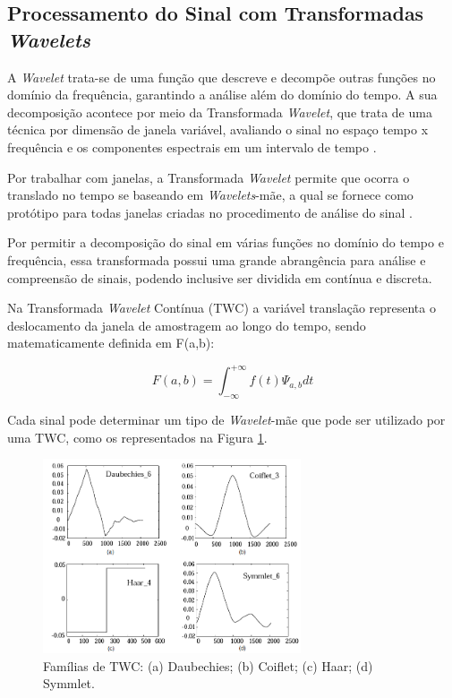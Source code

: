 \documentclass[conference]{IEEEtran}
\begin{document}
\subsection{Processamento do Sinal com Transformadas \textit{Wavelets}}
A \textit{Wavelet} trata-se de uma função que descreve e decompõe outras funções no domínio da frequência, garantindo a análise além do domínio do tempo. A sua decomposição acontece por meio da Transformada \textit{Wavelet}, que trata de uma técnica por dimensão de janela variável, avaliando o sinal no espaço tempo x frequência e os componentes espectrais em um intervalo de tempo \cite{graps95}.

Por trabalhar com janelas, a Transformada \textit{Wavelet} permite que ocorra o translado no tempo se baseando em \textit{Wavelets}-mãe, a qual se fornece como protótipo para todas janelas criadas no procedimento de análise do sinal \cite{graps95}.

Por permitir a decomposição do sinal em várias funções no domínio do tempo e frequência, essa transformada possui uma grande abrangência para análise e compreensão de sinais, podendo inclusive ser dividida em contínua e discreta.

Na Transformada \textit{Wavelet} Contínua (TWC) a variável translação representa o deslocamento da janela de amostragem ao longo do tempo, sendo matematicamente definida em F(a,b):

\[ 	F(a,b) = \int^{+\infty}_{-\infty} f(t)\Psi_{a,b} dt \]

Cada sinal pode determinar um tipo de \textit{Wavelet}-mãe que pode ser utilizado por uma TWC, como os representados na Figura \ref{waveletContinuaFamilias}.

\begin{figure}[!h]
	\centering
	\includegraphics[width=3in]{img/waveletContinuaFamilias}
	\caption{Famílias de TWC: (a) Daubechies; (b) Coiflet; (c) Haar; (d) Symmlet.}
	\label{waveletContinuaFamilias}
\end{figure}
\end{document}
